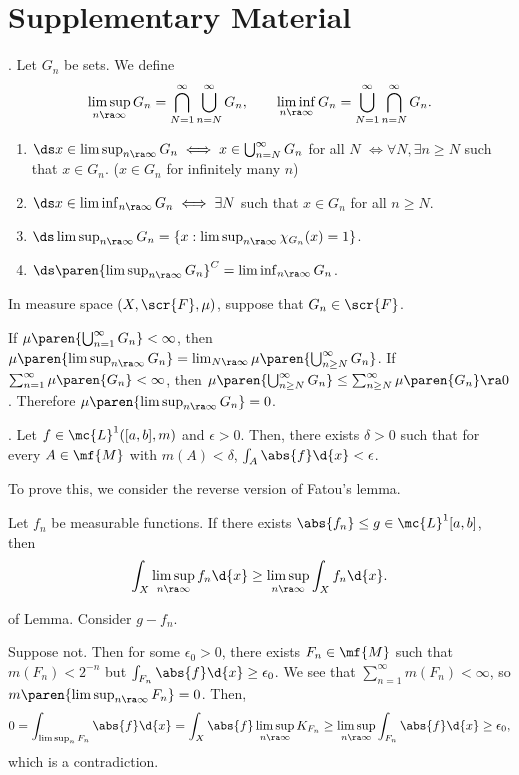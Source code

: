\section*{Supplementary Material}

. Let \(G_n\) be sets. We define
\[
    \limsup_{n \ra \infty} G_n = \bigcap_{N=1}^{\infty}\bigcup_{n=N}^{\infty} G_n, \qquad \liminf_{n \ra \infty} G_n = \bigcup_{N=1}^{\infty} \bigcap_{n=N}^{\infty} G_n.
\]

\rmk
\begin{enumerate}
    \item \(\ds x \in \limsup_{n \ra \infty} G_n \iff x \in \bigcup_{n=N}^{\infty} G_n\) for all \(N\) \(\iff \forall N, \exists n \geq N\) such that \(x \in G_n\). (\(x \in G_n\) for infinitely many \(n\))
    \item \(\ds x \in \liminf_{n \ra \infty} G_n \iff \exists N\) such that \(x\in G_n\) for all \(n \geq N\).
    \item \(\ds \limsup_{n \ra \infty} G_n = \{x : \limsup_{n \ra \infty} \chi_{G_n}(x) = 1\}\).
    \item \(\ds \paren{\limsup_{n \ra \infty} G_n}^C = \liminf_{n \ra \infty} G_n\).
\end{enumerate}

In measure space \((X, \scr{F}, \mu)\), suppose that \(G_n \in \scr{F}\).

If \(\mu\paren{\bigcup_{n=1}^{\infty} G_n} < \infty\), then \(\mu\paren{\limsup_{n \ra \infty} G_n} = \lim_{N \ra \infty} \mu\paren{\bigcup_{n\geq N}^{\infty} G_n}\). If \(\sum_{n=1}^{\infty} \mu\paren{G_n} < \infty\), then \(\mu\paren{\bigcup_{n\geq N}^{\infty} G_n} \leq \sum_{n\geq N}^{\infty} \mu\paren{G_n} \ra 0\). Therefore \(\mu\paren{\limsup_{n \ra \infty} G_n} = 0\).

\prop. Let \(f \in \mc{L}^{1}([a, b], m)\) and \(\epsilon > 0\). Then, there exists \(\delta > 0\) such that for every \(A \in \mf{M}\) with \(m(A) < \delta\), \(\int_A \abs{f} \d{x} < \epsilon\).

To prove this, we consider the reverse version of Fatou's lemma.

\lemma Let \(f_n\) be measurable functions. If there exists \(\abs{f_n} \leq g \in \mc{L}^1[a, b]\), then
\[
    \int_X \limsup_{n \ra \infty} f_n \d{x} \geq \limsup_{n \ra \infty} \int_X f_n \d{x}.
\]

\pf of Lemma. Consider \(g - f_n\).

\pf Suppose not. Then for some \(\epsilon_0 > 0\), there exists \(F_n \in \mf{M}\) such that \(m(F_n) < 2^{-n}\) but \(\int_{F_n} \abs{f} \d{x} \geq \epsilon_0\). We see that \(\sum_{n=1}^{\infty} m(F_n) < \infty\), so \(m\paren{\limsup_{n \ra \infty} F_n} = 0\). Then,
\[
    0 = \int_{\limsup_{n} F_n} \abs{f} \d{x} = \int_X \abs{f} \limsup_{n \ra \infty} K_{F_n} \geq \limsup_{n \ra \infty} \int_{F_n} \abs{f}\d{x} \geq \epsilon_0,
\]
which is a contradiction.

